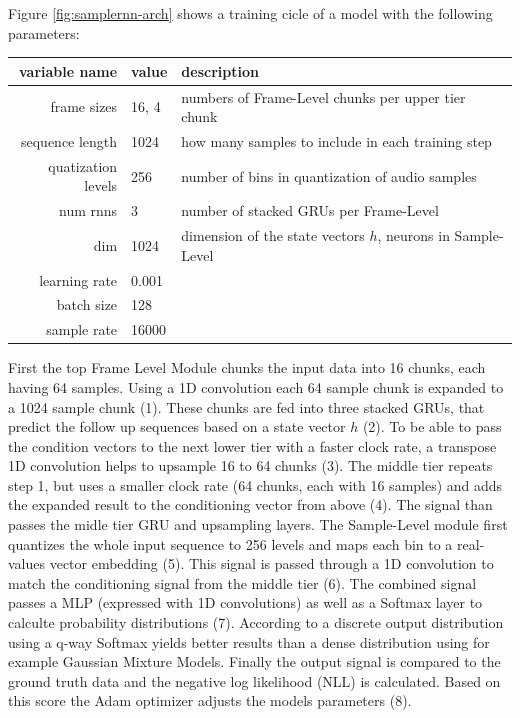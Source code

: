 \documentclass[12pt]{article}
\begin{document}
Figure \ref{fig:samplernn-arch} shows a training cicle of a model with the following parameters:
\begin{center}
\begin{tabular}{ r | l | l }
variable name & value & description \\
\hline
frame sizes & 16, 4 & numbers of Frame-Level chunks per upper tier chunk\\
sequence length & 1024 & how many samples to include in each training step\\
quatization levels & 256 & number of bins in quantization of audio samples\\
num rnns & 3 & number of stacked GRUs per Frame-Level \\%
dim & 1024 & dimension of the state vectors $h$, neurons in Sample-Level \\
learning rate & 0.001 & \\
batch size & 128 & \\
sample rate & 16000 & \\
\end{tabular}
\end{center}

First the top Frame Level Module chunks the input data into 16 chunks, each having 64 samples. 
Using a 1D convolution each 64 sample chunk is expanded to a 1024 sample chunk (1).
These chunks are fed into three stacked GRUs, that predict the follow up sequences based on a state vector $h$ (2).
To be able to pass the condition vectors to the next lower tier with a faster clock rate, a transpose 1D convolution helps to upsample 16 to 64 chunks (3).
The middle tier repeats step 1, but uses a smaller clock rate (64 chunks, each with 16 samples) and adds the expanded result to the conditioning vector from above (4).
The signal than passes the midle tier GRU and upsampling layers.
The Sample-Level module first quantizes the whole input sequence to 256 levels and maps each bin to a real-values vector embedding (5).
This signal is passed through a 1D convolution to match the conditioning signal from the middle tier (6).
The combined signal passes a MLP (expressed with 1D convolutions) as well as a Softmax layer to calculte probability distributions (7).
According to \cite{mehri2016samplernn} a discrete output distribution using a q-way Softmax yields better results than a dense distribution using for example Gaussian Mixture Models.
Finally the output signal is compared to the ground truth data and the negative log likelihood (NLL) is calculated.
Based on this score the Adam optimizer adjusts the models parameters (8). 
\end{document}
